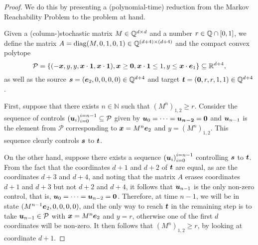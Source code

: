 \begin{proof}
We do this by presenting a (polynomial-time) reduction from the Markov Reachability Problem to the problem at hand.

Given a (column-)stochastic matrix $M \in \mathbb{Q}^{d \times d}$ and a number $r \in \mathbb{Q} \cap [0,1]$, we define the matrix $A=\operatorname{diag}(M, 0, 1, 0, 1) \in \mathbb{Q}^{(d+4)\times (d+4)}$ and
the compact convex polytope
\begin{equation*}
\mathcal{P} = \lbrace (-\boldsymbol{x}, y, y, \boldsymbol{x} \cdot \boldsymbol{1}, \boldsymbol{x} \cdot \boldsymbol{1}), \boldsymbol{x} \geq \boldsymbol{0}, \boldsymbol{x} \cdot \boldsymbol{1} \leq 1, y \leq \boldsymbol{x} \cdot \boldsymbol{e}_{1} \rbrace \subseteq \mathbb{R}^{d+4},
\end{equation*}
as well as the source $\boldsymbol{s} = (\boldsymbol{e}_{2}, 0, 0, 0, 0) \in \mathbb{Q}^{d+4}$ and target $\boldsymbol{t} = (\boldsymbol{0}, r, r, 1, 1) \in \mathbb{Q}^{d+4}$.

First, suppose that there exists $n \in \mathbb{N}$ such that $\left( M^{n} \right)_{1,2} \geq r$. Consider the sequence of controls $\left( \boldsymbol{u}_{i} \right)_{i=0}^{i=n-1} \subseteq \mathcal{P}$ given by $\boldsymbol{u}_{0} = \cdots = \boldsymbol{u_{n-2}} = \boldsymbol{0}$ and $\boldsymbol{u}_{n-1}$ is the element from $\mathcal{P}$ corresponding to $\boldsymbol{x} = M^{n} \boldsymbol{e}_{2}$ and $y=\left( M^{n} \right)_{1,2}$. This sequence clearly controls $\boldsymbol{s}$ to $\boldsymbol{t}$.

On the other hand, suppose there exists a sequence $\left( \boldsymbol{u}_{i} \right)_{i=0}^{i=n-1}$ controlling $\boldsymbol{s}$ to $\boldsymbol{t}$.
From the fact that the coordinates $d+1$ and $d+2$ of $\boldsymbol{t}$ are equal, as are the coordinates $d+3$ and $d+4$, and noting that the matrix $A$ erases coordinates $d+1$ and $d+3$ but not $d+2$ and $d+4$, it follows that $\boldsymbol{u}_{n-1}$ is the only non-zero control, that is, $\boldsymbol{u}_{0} = \cdots = \boldsymbol{u}_{n-2} = \boldsymbol{0}$.
Therefore, at time $n-1$, we will be in state $(M^{n-1} \boldsymbol{e}_{2}, 0, 0, 0, 0)$, and the only way to reach $\boldsymbol{t}$ in the remaining step is to take $\boldsymbol{u}_{n-1} \in \mathcal{P}$ with $\boldsymbol{x} = M^{n} \boldsymbol{e}_{2}$ and $y=r$, otherwise one of the first $d$ coordinates will be non-zero. It then follows that $\left( M^{n} \right)_{1,2} \geq r$, by looking at coordinate $d+1$.
\end{proof}

